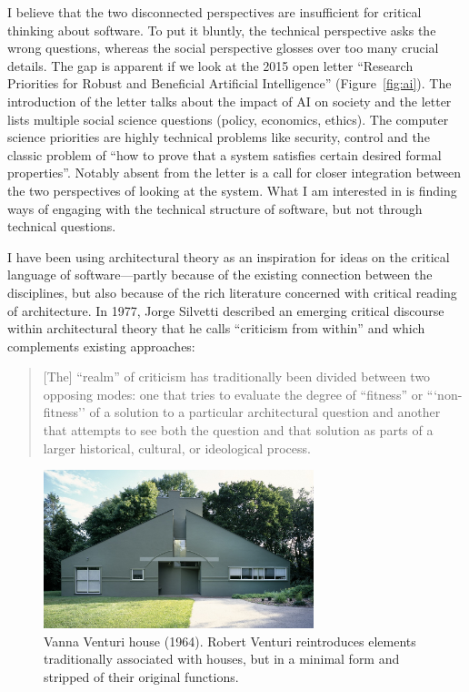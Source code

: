 I believe that the two disconnected perspectives are insufficient for critical thinking about
software. To put it bluntly, the technical perspective asks the wrong questions, whereas the social
perspective glosses over too many crucial details. The gap is apparent if we look at the
2015 open letter ``Research Priorities for Robust and Beneficial Artificial
Intelligence'' (Figure~\ref{fig:ai}). The introduction of the letter talks
about the impact of AI on society and the letter lists multiple social science questions (policy,
economics, ethics). The computer science priorities are highly technical problems like security,
control and the classic problem of ``how to prove that a system satisfies certain desired formal
properties''. Notably absent from the letter is a call for closer integration between the
two perspectives of looking at the system. What I am interested in is finding ways
of engaging with the technical structure of software, but not through technical questions.

I have been using architectural theory as an inspiration for ideas on the critical language
of software---partly because of the existing connection between the disciplines, but also
because of the rich literature concerned with critical reading of architecture.
In 1977, Jorge Silvetti described an emerging critical discourse within architectural theory that
he calls ``criticism from within'' and which complements existing
approaches:

\begin{quote}
[The] ``realm'' of criticism has traditionally been divided between two opposing modes: one
that tries to evaluate the degree of ``fitness'' or ```non-fitness'' of a solution
to a particular architectural question and another that attempts to see both the question and
that solution as parts of a larger historical, cultural, or ideological process.
\end{quote}

\begin{figure}
\centering
\vspace{-1em}
\includegraphics[width=0.7\textwidth]{fig/venturi.jpg}
\caption{Vanna Venturi house (1964). Robert Venturi reintroduces elements traditionally associated
with houses, but in a minimal form and stripped of their original functions.}
\label{fig:vanna}
\end{figure}

